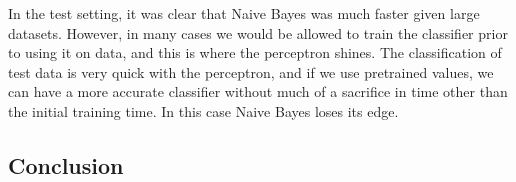 \documentclass{article}
\theoremstyle{remark}
\begin{document}
     In the test setting, it was clear that Naive Bayes was much faster given large datasets. However, in many cases we would be allowed to train the classifier prior to using it on data, and this is where the perceptron shines. The classification of test data is very quick with the perceptron, and if we use pretrained values, we can have a more accurate classifier without much of a sacrifice in time other than the initial training time. In this case Naive Bayes loses its edge.
     \subsection*{Conclusion}



    
\end{document}
